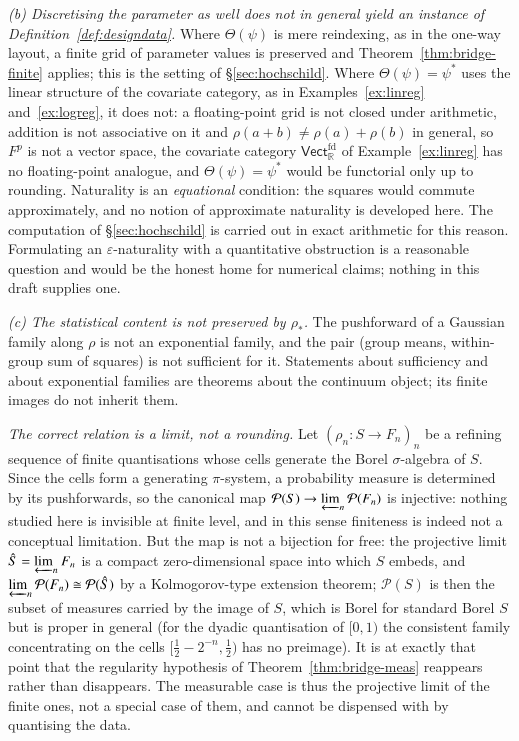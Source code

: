 \documentclass[11pt,a4paper]{article}
\theoremstyle{plain}
\theoremstyle{definition}
\theoremstyle{remark}
\newcommand{\cat}[1]{\mathsf{#1}}
\newcommand{\Prb}{\mathcal{P}}
\newcommand{\R}{\mathbb{R}}
\newcommand{\Vect}{\cat{Vect}}
\begin{document}
\emph{(b) Discretising the parameter as well does not in general yield an
instance of Definition~\ref{def:designdata}.} Where $\Theta(\psi)$ is mere
reindexing, as in the one-way layout, a finite grid of parameter values is
preserved and Theorem~\ref{thm:bridge-finite} applies; this is the setting
of \S\ref{sec:hochschild}. Where $\Theta(\psi) = \psi^{*}$ uses the linear
structure of the covariate category, as in Examples~\ref{ex:linreg}
and~\ref{ex:logreg}, it does not: a floating-point grid is not closed under
arithmetic, addition is not associative on it and $\rho(a+b) \neq
\rho(a)+\rho(b)$ in general, so $F^{p}$ is not a vector space, the covariate
category $\Vect_{\R}^{\mathrm{fd}}$ of Example~\ref{ex:linreg} has no
floating-point analogue, and $\Theta(\psi) = \psi^{*}$ would be functorial only
up to rounding. Naturality is an \emph{equational} condition: the squares would
commute approximately, and no notion of approximate naturality is developed
here. The computation of \S\ref{sec:hochschild} is carried out in exact
arithmetic for this reason. Formulating an $\varepsilon$-naturality with a
quantitative obstruction is a reasonable question and would be the honest home
for numerical claims; nothing in this draft supplies one.

\emph{(c) The statistical content is not preserved by $\rho_{*}$.} The
pushforward of a Gaussian family along $\rho$ is not an exponential family, and
the pair (group means, within-group sum of squares) is not sufficient for it.
Statements about sufficiency and about exponential families are theorems about
the continuum object; its finite images do not inherit them.

\medskip
\emph{The correct relation is a limit, not a rounding.} Let $(\rho_n \colon S \to F_n)_{n}$ be a
refining sequence of finite quantisations whose cells generate the Borel
$\sigma$-algebra of $S$. Since the cells form a generating $\pi$-system, a
probability measure is determined by its pushforwards, so the canonical map
$\Prb(S) \to \varprojlim_n \Prb(F_n)$ is injective: nothing studied here is
invisible at finite level, and in this sense finiteness is indeed not a
conceptual limitation. But the map is not a bijection for free: the projective
limit $\hat S = \varprojlim_n F_n$ is a compact zero-dimensional space into
which $S$ embeds, and $\varprojlim_n \Prb(F_n) \cong \Prb(\hat S)$ by a
Kolmogorov-type extension theorem; $\Prb(S)$ is then the subset of measures
carried by the image of $S$, which is Borel for standard Borel $S$ but is
proper in general (for the dyadic quantisation of $[0,1)$ the consistent
family concentrating on the cells $[\tfrac12 - 2^{-n}, \tfrac12)$ has no
preimage). It is at exactly that point that the regularity hypothesis of
Theorem~\ref{thm:bridge-meas} reappears rather than disappears.
The measurable case is thus the projective limit of the finite ones, not a
special case of them, and cannot be dispensed with by quantising the data.
\end{document}
